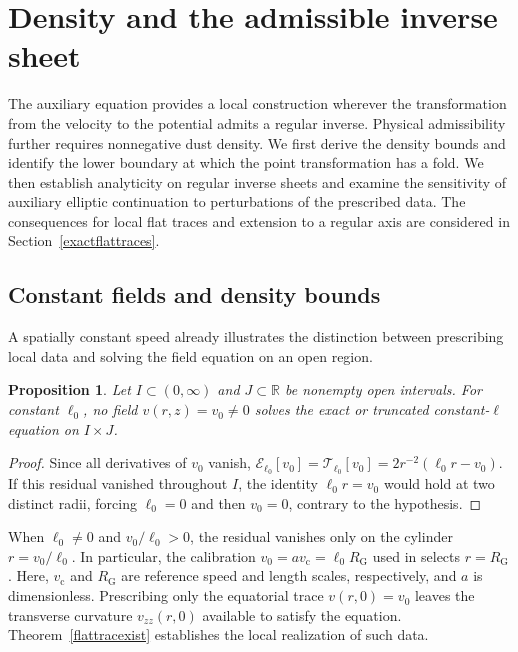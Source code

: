\documentclass[amsmath,amsfonts,amssymb,aps,pra,superscriptaddress,10pt]{revtex4-2}
\numberwithin{equation}{section}
\theoremstyle{plain}
\newtheorem{proposition}{Proposition}
\theoremstyle{definition}
\theoremstyle{remark}
\theoremstyle{definition}
\newcommand{\ellzero}{\ell_0}
\newcommand{\RG}{R_{\mathrm G}}
\newcommand{\vc}{v_{\mathrm c}}
\newcommand{\ET}{\mathcal T_{\ellzero}}
\newcommand{\EE}{\mathcal E_{\ellzero}}
\begin{document}
\section{Density and the admissible inverse sheet}

The auxiliary equation provides a local construction wherever the transformation from the velocity to the potential admits a regular inverse. Physical admissibility further requires nonnegative dust density. We first derive the density bounds and identify the lower boundary at which the point transformation has a fold. We then establish analyticity on regular inverse sheets and examine the sensitivity of auxiliary elliptic continuation to perturbations of the prescribed data. The consequences for local flat traces and extension to a regular axis are considered in Section~\ref{exactflattraces}.


\subsection{Constant fields and density bounds}

A spatially constant speed already illustrates the distinction between
prescribing local data and solving the field equation on an open region.

\begin{proposition}
Let $I\subset(0,\infty)$ and $J\subset\mathbb{R}$ be nonempty open
intervals. For constant $\ellzero$, no field $v(r,z)=v_0\neq 0$ solves
the exact or truncated constant-$\ell$ equation on $I\times J$.
\end{proposition}

\begin{proof}
Since all derivatives of $v_0$ vanish, $\EE[v_0]=\ET[v_0]=2r^{-2}(\ellzero r-v_0)$. If this residual vanished throughout $I$, the identity $\ellzero r=v_0$ would hold at two distinct radii, forcing $\ellzero=0$ and then $v_0=0$, contrary to the hypothesis.
\end{proof}

When $\ellzero\neq 0$ and $v_0/\ellzero>0$, the residual vanishes only on the cylinder $r=v_0/\ellzero$. In particular, the calibration
$v_0=a\vc=\ellzero\RG$ used in \cite{Astesiano2022EPJC} selects
$r=\RG$. Here, $\vc$ and $\RG$ are reference speed and length scales, respectively, and $a$ is dimensionless. Prescribing only the equatorial trace $v(r,0)=v_0$ leaves the transverse curvature $v_{zz}(r,0)$ available to satisfy the equation. Theorem~\ref{flattracexist} establishes the local realization of such data.
\end{document}

